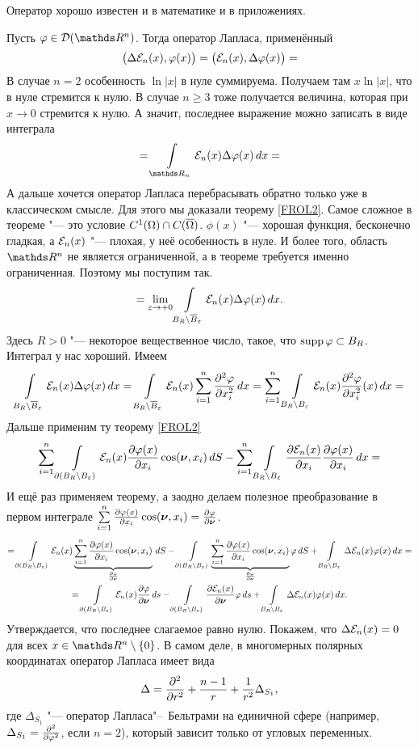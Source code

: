 Оператор хорошо известен и в математике и в приложениях.
\begin{Proof}
  Пусть $\phi\in \D(\R^n)$. Тогда оператор Лапласа, применённый
\[
  \big(\Delta\mathcal E_n(x),\varphi(x)\big) = \big(\mathcal E_n(x),\Delta\varphi(x)\big) = 
\]
В случае $n=2$ особенность $\ln|x|$ в нуле суммируема. Получаем там $x\ln |x|$, что в нуле стремится к нулю. В случае $n\ge3$ тоже получается величина, которая при $x\to0$ стремится к нулю. А значит, последнее выражение можно записать в виде интеграла
\[
  = \Gint{\R_n}\E_n(x)\Delta\phi(x)\,dx = 
\]
А дальше хочется оператор Лапласа перебрасывать обратно только уже в классическом смысле. Для этого мы доказали теорему \ref{FROL2}. Самое сложное в теореме "--- это условие $C^1(\Omega)\cap C(\overline{\Omega})$. $\phi(x)$ "--- хорошая функция, бесконечно гладкая, а $\mathcal E_n(x)$ "--- плохая, у неё особенность в нуле. И более того, область $\R^n$ не является ограниченной, а в теореме требуется именно ограниченная. Поэтому мы поступим так.
\[
  = \lim\limits_{\varepsilon\rightarrow+0}\int\limits_{B_R\setminus \overline{B}_\varepsilon}\mathcal E_n(x)\Delta\varphi(x)\,dx.
\]
Здесь $R>0$ "--- некоторое вещественное число, такое, что $\operatorname{supp}\varphi\subset B_R$. Интеграл у нас хороший. Имеем
\[
  \int\limits_{B_R\setminus \overline{B}_\varepsilon}\mathcal E_n(x)\Delta\varphi(x)\,dx = \int\limits_{B_R\setminus\overline{B}_\varepsilon}\mathcal E_n(x)\sum\limits_{i = 1}^{n}\frac{\partial ^2\varphi}{\partial x_i^2}\,dx = 
  \sum\limits_{i = 1}^{n}\int\limits_{B_R\setminus B_\varepsilon}\mathcal E_n(x)\frac{\partial ^2\varphi}{\partial x_i^2}(x)\,dx = 
\]
Дальше применим ту теорему \ref{FROL2}
\[
  \sum\limits_{i = 1}^{n}\int\limits_{\partial(B_R\setminus B_\varepsilon)}\mathcal E_n(x)\frac{\partial \varphi(x)}{\partial x_i}\cos(\boldsymbol{\nu},x_i)\,dS
  - \sum\limits_{i = 1}^{n}\int\limits_{B_R\setminus B_\varepsilon}\frac{\partial \mathcal E_n(x)}{\partial x_i}\frac{\partial \varphi(x)}{\partial x_i}\,dx=
\]
И ещё раз применяем теорему, а заодно делаем полезное преобразование в первом интеграле $\sum\limits_{i = 1}^{n}\frac{\partial \varphi(x)}{\partial x_i}\cos(\boldsymbol{\nu},x_i) = \frac{\partial \varphi}{\partial \boldsymbol{\nu}}$.
\begin{multline*}
  = \int\limits_{\partial(B_R\setminus B_\varepsilon)}\mathcal E_n(x) \underbrace{\sum\limits_{i = 1}^{n}\frac{\partial \varphi(x)}{\partial x_i}\cos(\boldsymbol{\nu},x_i)}_{\frac{\partial \varphi}{\partial \boldsymbol{\nu}}}\,dS - 
    \int\limits_{\partial(B_R\setminus B_\varepsilon)} \underbrace{\sum\limits_{i = 1}^{n}\frac{\partial \varphi(x)}{\partial x_i}\cos(\boldsymbol{\nu},x_i)}_{\frac{\partial \varphi}{\partial \boldsymbol{\nu}}}\varphi\,dS + 
    \int\limits_{B_R\setminus B_\varepsilon}\Delta\mathcal E_n(x)\varphi(x)\,dx = \\
  =\int\limits_{\partial(B_R\setminus B_\varepsilon)}\mathcal E_n(x)\frac{\partial \varphi}{\partial \boldsymbol{\nu}}\,ds - \int\limits_{\partial(B_R\setminus B_\varepsilon)}\frac{\partial \mathcal E_n(x)}{\partial \boldsymbol{\nu}}\varphi\,ds +
    \int\limits_{B_R\setminus B_\varepsilon}\Delta\mathcal E_n(x)\varphi(x)\,dx.
\end{multline*}
Утверждается, что последнее слагаемое равно нулю. Покажем, что $\Delta\mathcal E_n(x)=0$ для всех $x\in\R^n\dd\{0\}$. В самом деле, в многомерных полярных координатах оператор Лапласа имеет вида
\[
  \Delta = \frac{\partial ^2}{\partial r^2}+\frac{n-1}r+\frac1{r^2}\Delta_{S_1},
\]
где $\Delta_{S_1}$ "--- оператор Лапласа"--~Бельтрами на единичной сфере (например, $\Delta_{S_1} = \frac{\partial ^2}{\partial \varphi^2}$, если $n=2$), который зависит только от угловых переменных.


\end{Proof}
